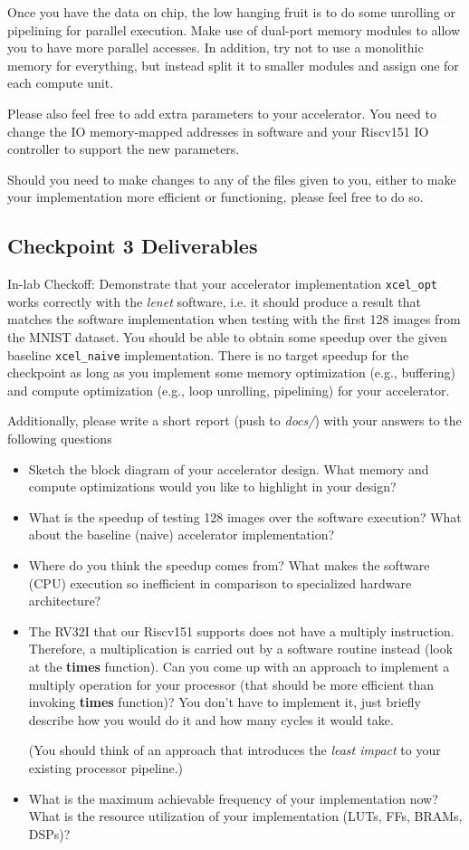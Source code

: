 \documentclass[11pt]{article}
\begin{document}
Once you have the data on chip, the low hanging fruit is to do some unrolling or pipelining for parallel execution. Make use of dual-port memory modules to allow you to have more parallel accesses. In addition, try not to use a monolithic memory for everything, but instead split it to smaller modules and assign one for each compute unit.

Please also feel free to add extra parameters to your accelerator. You need to change the IO memory-mapped addresses in software and your Riscv151 IO controller to support the new parameters.

Should you need to make changes to any of the files given to you, either to make your implementation more efficient or functioning, please feel free to do so.

\subsection{Checkpoint 3 Deliverables}

In-lab Checkoff: Demonstrate that your accelerator implementation \verb|xcel_opt| works correctly with the \textit{lenet} software, i.e. it should produce a result that matches the software implementation when testing with the first 128 images from the MNIST dataset. You should be able to obtain some speedup over the given baseline \verb|xcel_naive| implementation. There is no target speedup for the checkpoint as long as you implement some memory optimization (e.g., buffering) and compute optimization (e.g., loop unrolling, pipelining) for your accelerator.

Additionally, please write a short report (push to \textit{docs/}) with your answers to the following questions
\begin{itemize}
\item Sketch the block diagram of your accelerator design. What memory and compute optimizations would you like to highlight in your design?
\item What is the speedup of testing 128 images over the software execution? What about the baseline (naive) accelerator implementation?
\item Where do you think the speedup comes from? What makes the software (CPU) execution so inefficient in comparison to specialized hardware architecture?
\item The RV32I that our Riscv151 supports does not have a multiply instruction. Therefore, a multiplication is carried out by a software routine instead (look at the \textbf{times} function). Can you come up with an approach to implement a multiply operation for your processor (that should be more efficient than invoking \textbf{times} function)? You don't have to implement it, just briefly describe how you would do it and how many cycles it would take.

(You should think of an approach that introduces the \textit{least impact} to your existing processor pipeline.)
\item What is the maximum achievable frequency of your implementation now? What is the resource utilization of your implementation (LUTs, FFs, BRAMs, DSPs)?
\end{itemize}
\end{document}

